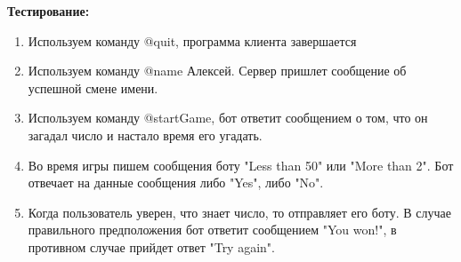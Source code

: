 \documentclass{article}
\begin{document}
	
	\textbf{Тестирование:}
	\begin{enumerate}
		\item Используем команду @quit, программа клиента завершается
		\item Используем команду @name Алексей. Сервер пришлет сообщение об успешной смене имени.
		\item Используем команду @startGame, бот ответит сообщением о том, что он загадал число и настало время его угадать.
		\item Во время игры пишем сообщения боту "Less than 50" или "More than 2". Бот отвечает на данные сообщения либо "Yes", либо "No".
		\item Когда пользователь уверен, что знает число, то отправляет его боту. В случае правильного предположения бот ответит сообщением "You won!", в противном случае прийдет ответ "Try again". 
	\end{enumerate}
\end{document}
